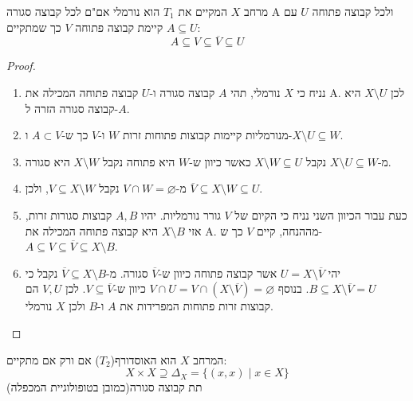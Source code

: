\documentclass{tstextbook}
\begin{document}
\begin{proposition}
מרחב \(X\) המקיים את \(T_{1}\) הוא נורמלי אם"ם לכל קבוצה סגורה A ולכל קבוצה פתוחה \(U\) עם \(A\subseteq U\) קיימת קבוצה פתוחה \(V\) כך שמתקיים:
$$A\subseteq V\subseteq \overline{V} \subseteq U$$

\end{proposition}
\begin{proof}
  \begin{enumerate}
    \item נניח כי \(X\) נורמלי, תהי \(A\) קבוצה סגורה ו-\(U\) קבוצה פתוחה המכילה את A. לכן \(X\setminus U\) היא קבוצה סגורה הזרה ל-\(A\). 


    \item מנורמליות קיימות קבוצות פתוחות זרות \(W\) ו-\(V\) כך ש-\(A \subset V\) ו-\(X \setminus U \subseteq W\). 


    \item מ-\(X\setminus U \subseteq W\) נקבל \(X\setminus W\subseteq U\) כאשר כיוון ש-\(W\) היא פתוחה נקבל \(X\setminus W\) היא סגורה. 


    \item מ-\(V\cap W=\varnothing\) נקבל \(V\subseteq X \setminus W\), ולכן \(\overline{V}\subseteq X \setminus W\subseteq U\). 


    \item כעת עבור הכיוון השני נניח כי הקיום של \(V\) גורר נורמליות. יהיו \(A,B\) קבוצות סגורות זרות, אזי \(X\setminus B\) היא קבוצה פתוחה המכילה את A. מההנחה, קיים \(V\) כך ש-\(A\subseteq V\subseteq \overline{ V}\subseteq X\setminus B\).  


    \item יהי \(U=X \setminus \overline{V}\) אשר קבוצה פתוחה כיוון ש-\(\overline{ V}\) סגורה. מ-\(\overline{V}\subseteq X \setminus B\) נקבל כי \(B\subseteq X\setminus \overline{ V}=U\). בנוסף \(V\cap U = V\cap(X \setminus \overline{ V})=\varnothing\) כיוון ש-\(V\subseteq \overline{ V}\). לכן \(V,U\) הם קבוצות זרות פתוחות המפרידות את \(A\) ו-\(B\) ולכן \(X\) נורמלי. 


  \end{enumerate}
\end{proof}
\begin{proposition}
המרחב \(X\) הוא האוסדורף(\(T_{2}\)) אם ורק אם מתקיים:
$$X\times X\supseteq \Delta_{X}=\{ (x,x)\mid x \in X \}$$
תת קבוצה סגורה(כמובן בטופולוגיית המכפלה)

\end{proposition}
\end{document}
